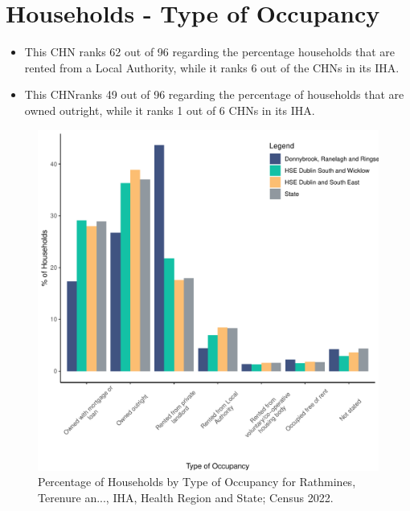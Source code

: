 \documentclass{article}
\begin{document}
\section{Households - Type of Occupancy}\label{sect:Households}
\begin{itemize}
\item This CHN ranks  62 out of 96 regarding the percentage households that are rented from a Local Authority, while it ranks  6 out of the CHNs in its IHA. 
\item This CHNranks  49 out of 96 regarding the percentage of households that are owned outright, while it ranks   1 out of 6 CHNs in its IHA.
\end{itemize}
\begin{figure}[H]
	\centering
	\includegraphics[width = 140mm]{../figures/HouseholdsED.pdf}
	\caption{Percentage of Households by Type of Occupancy for Rathmines, Terenure an..., IHA, Health Region and State; Census 2022.}
	\label{fig:vbnv}
	\end{figure}
\end{document}
